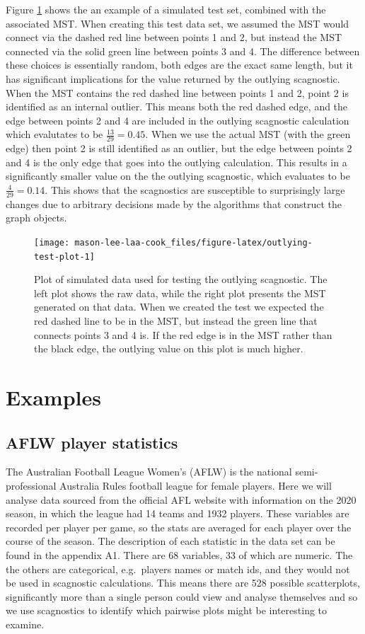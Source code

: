 Figure \ref{fig:outlying-test-plot} shows the an example of a simulated test set, combined with the associated MST. When creating this test data set, we assumed the MST would connect via the dashed red line between points 1 and 2, but instead the MST connected via the solid green line between points 3 and 4. The difference between these choices is essentially random, both edges are the exact same length, but it has significant implications for the value returned by the outlying scagnostic. When the MST contains the red dashed line between points 1 and 2, point 2 is identified as an internal outlier. This means both the red dashed edge, and the edge between points 2 and 4 are included in the outlying scagnostic calculation which evalutates to be \(\frac{13}{29}=0.45\). When we use the actual MST (with the green edge) then point 2 is still identified as an outlier, but the edge between points 2 and 4 is the only edge that goes into the outlying calculation. This results in a significantly smaller value on the the outlying scagnostic, which evaluates to be \(\frac{4}{29}=0.14\). This shows that the scagnostics are susceptible to surprisingly large changes due to arbitrary decisions made by the algorithms that construct the graph objects.

\begin{figure}
\texttt{[image: mason-lee-laa-cook\_files/figure-latex/outlying-test-plot-1]} \caption{Plot of simulated data used for testing the outlying scagnostic. The left plot shows the raw data, while the right plot presents the MST generated on that data. When we created the test we expected the red dashed line to be in the MST, but instead the green line that connects points 3 and 4 is. If the red edge is in the MST rather than the black edge, the outlying value on this plot is much higher.}\label{fig:outlying-test-plot}
\end{figure}

\section{Examples}\label{examples}

\subsection{AFLW player statistics}\label{aflw-player-statistics}

The Australian Football League Women's (AFLW) is the national semi-professional Australia Rules football league for female players. Here we will analyse data sourced from the official AFL website with information on the 2020 season, in which the league had 14 teams and 1932 players. These variables are recorded per player per game, so the stats are averaged for each player over the course of the season. The description of each statistic in the data set can be found in the appendix A1. There are 68 variables, 33 of which are numeric. The the others are categorical, e.g.~players names or match ids, and they would not be used in scagnostic calculations. This means there are 528 possible scatterplots, significantly more than a single person could view and analyse themselves and so we use scagnostics to identify which pairwise plots might be interesting to examine.

